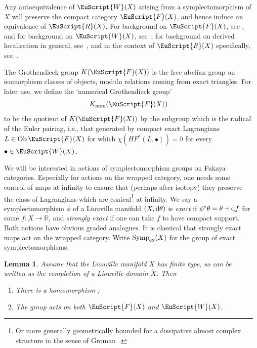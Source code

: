 \documentclass[10pt,a4paper]{amsart}
\def\scrR{\EuScript{R}}
\newcommand{\scrF}{\EuScript{F}}
\def\scrW{\EuScript{W}}
\DeclareMathOperator{\Symp}{Symp}
\def\bR{\mathbb{R}}
\newtheorem{lem}[thm]{Lemma}
\theoremstyle{definition}
\numberwithin{equation}{section}
\begin{document}
 Any autoequivalence of $\scrW(X)$ arising from a symplectomorphism of $X$ will preserve the compact category $\scrF(X)$, and hence induce an equivalence of $\scrR(X)$. For background on $\scrF(X)$, see \cite{Seidel:FCPLT}, and for background on $\scrW(X)$, see~\cite{Abouzaid-Seidel:Viterbo}; for background on derived localisation in general, see~\cite{Drinfeld}, and in the context of $\scrR(X)$ specifically, see~\cite{GGV}.

The Grothendieck group $K(\scrF(X))$ is the free abelian group on isomorphism classes of objects, modulo relations coming from exact triangles.
For later use, we define the `numerical Grothendieck group'
\begin{equation}\label{eqn:Knum}
K_{\rm num}(\scrF(X))
\end{equation}
to be the quotient of $K(\scrF(X))$ by the subgroup which is the radical of the Euler pairing, i.e., that generated by compact exact Lagrangians $L \in \mathrm{Ob}\,\scrF(X)$ for which $\chi(HF^*(L,\bullet)) = 0$ for every $\bullet \in \scrW(X)$.

We will be interested in actions of symplectomorphism groups on Fukaya categories. Especially for actions on the wrapped category, one needs some control of maps at infinity to ensure that (perhaps after isotopy) they preserve the class of Lagrangians which are conical\footnote{Or more generally geometrically bounded for a dissipative almost complex structure in the sense of Groman~\cite{Groman}.} at infinity. We say a symplectomorphism $\phi$ of a Liouville manifold $(X,{\rm d}\theta)$ is \emph{exact} if $\phi^*\theta = \theta + {\rm d}f$ for some $f\colon X \to \bR$, and \emph{strongly exact} if one can take $f$ to have compact support. Both notions have obvious graded analogues. It is classical that strongly exact maps act on the wrapped category. Write $\Symp_{\rm ex}(X)$ for the group of exact symplectomorphisms.

\begin{lem}\label{lem:acts}
 Assume that the Liouville manifold $X$ has finite type, so can be written as the completion of a Liouville domain $\mathring{X}$. Then
 \begin{enumerate}\itemsep=0pt
 \item[$(1)$] There is a homomorphism \smash{$\pi_0\Symp_{\rm ct}(X) \to \pi_0\Symp_{\rm ex}\bigl(\mathring{X}\bigr)$};
 \item[$(2)$] The group \smash{$\pi_0\Symp\bigl(\mathring{X}\bigr)$} acts on both $\scrF(X)$ and $\scrW(X)$.
 \end{enumerate}
\end{lem}
\end{document}

